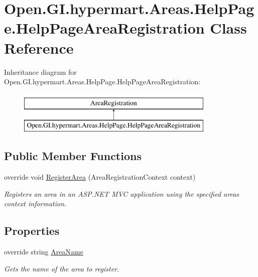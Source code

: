\hypertarget{class_open_1_1_g_i_1_1hypermart_1_1_areas_1_1_help_page_1_1_help_page_area_registration}{}\section{Open.\+G\+I.\+hypermart.\+Areas.\+Help\+Page.\+Help\+Page\+Area\+Registration Class Reference}
\label{class_open_1_1_g_i_1_1hypermart_1_1_areas_1_1_help_page_1_1_help_page_area_registration}


 


Inheritance diagram for Open.\+G\+I.\+hypermart.\+Areas.\+Help\+Page.\+Help\+Page\+Area\+Registration\+:\begin{figure}[H]
\begin{center}
\leavevmode
\includegraphics[height=2.000000cm]{class_open_1_1_g_i_1_1hypermart_1_1_areas_1_1_help_page_1_1_help_page_area_registration}
\end{center}
\end{figure}
\subsection*{Public Member Functions}
\begin{DoxyCompactItemize}
\item 
override void \hyperlink{class_open_1_1_g_i_1_1hypermart_1_1_areas_1_1_help_page_1_1_help_page_area_registration_aee73751274402f096ce32ee010ef1a11}{Register\+Area} (Area\+Registration\+Context context)
\begin{DoxyCompactList}\small\item\em Registers an area in an A\+S\+P.\+N\+ET M\+VC application using the specified area\textquotesingle{}s context information. \end{DoxyCompactList}\end{DoxyCompactItemize}
\subsection*{Properties}
\begin{DoxyCompactItemize}
\item 
override string \hyperlink{class_open_1_1_g_i_1_1hypermart_1_1_areas_1_1_help_page_1_1_help_page_area_registration_a98b4d777a4852021b9a120b1eb5cd08a}{Area\+Name}
\begin{DoxyCompactList}\small\item\em Gets the name of the area to register. \end{DoxyCompactList}\end{DoxyCompactItemize}


